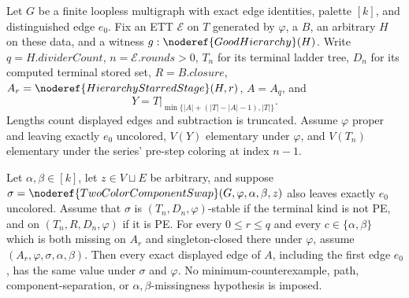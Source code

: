 \begin{helper}
Let $G$ be a finite loopless multigraph with exact edge identities, palette
$[k]$, and distinguished edge $e_0$.  Fix an ETT $\mathcal E$ on $T$
generated by $\varphi$, a  $B$, an arbitrary
 $H$ on these data, and a witness
$g:\noderef{GoodHierarchy}(H)$.
Write $q=H.\mathit{dividerCount}$, $n=\mathcal E.\mathit{rounds}>0$,
$T_n$ for its terminal ladder tree, $D_n$ for its computed terminal
stored set, $R=B.\mathit{closure}$, $A_r=\noderef{HierarchyStarredStage}(H,r)$,
$A=A_q$, and
\[
 Y=T|_{\min\{|A|+(|T|-|A|-1),|T|\}}.
\]
Lengths count displayed edges and subtraction is truncated.
Assume $\varphi$ proper and leaving exactly $e_0$ uncolored,
$V(Y)$ elementary under $\varphi$, and $V(T_n)$ elementary under the
series' pre-step coloring at index $n-1$.

Let $\alpha,\beta\in[k]$, let $z\in V\sqcup E$ be arbitrary, and suppose
$\sigma=\noderef{TwoColorComponentSwap}(G,\varphi,\alpha,\beta,z)$
also leaves exactly $e_0$ uncolored.  Assume that $\sigma$ is
$(T_n,D_n,\varphi)$-stable if the terminal kind is not PE, and
 on $(T_n,R,D_n,\varphi)$ if it is PE.
For every $0\le r\le q$ and every $c\in\{\alpha,\beta\}$ which is both
missing on $A_r$ and singleton-closed there under $\varphi$, assume
$(A_r,\varphi,\sigma,\alpha,\beta)$.
Then every exact displayed edge of $A$, including the first edge $e_0$,
has the same value under $\sigma$ and $\varphi$.
No minimum-counterexample, path, component-separation, or
$\alpha,\beta$-missingness hypothesis is imposed.
\end{helper}
